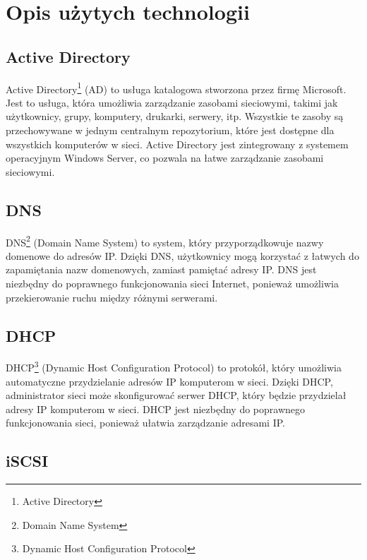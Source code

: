 \newpage
\section{Opis użytych technologii}		%

\subsection{Active Directory} 

Active Directory\footnote{Active Directory\cite{ActiveDirectoryWiki}} (AD) to usługa katalogowa stworzona przez firmę Microsoft. Jest to usługa, która umożliwia zarządzanie zasobami sieciowymi, takimi jak użytkownicy, grupy, komputery, drukarki, serwery, itp. Wszystkie te zasoby są przechowywane w jednym centralnym repozytorium, które jest dostępne dla wszystkich komputerów w sieci. Active Directory jest zintegrowany z systemem operacyjnym Windows Server, co pozwala na łatwe zarządzanie zasobami sieciowymi.

\subsection{DNS}

DNS\footnote{Domain Name System\cite{DNSWiki}} (Domain Name System) to system, który przyporządkowuje nazwy domenowe do adresów IP. Dzięki DNS, użytkownicy mogą korzystać z łatwych do zapamiętania nazw domenowych, zamiast pamiętać adresy IP. DNS jest niezbędny do poprawnego funkcjonowania sieci Internet, ponieważ umożliwia przekierowanie ruchu między różnymi serwerami.

\subsection{DHCP}

DHCP\footnote{Dynamic Host Configuration Protocol\cite{DHCPwiki}} (Dynamic Host Configuration Protocol) to protokół, który umożliwia automatyczne przydzielanie adresów IP komputerom w sieci. Dzięki DHCP, administrator sieci może skonfigurować serwer DHCP, który będzie przydzielał adresy IP komputerom w sieci. DHCP jest niezbędny do poprawnego funkcjonowania sieci, ponieważ ułatwia zarządzanie adresami IP.

\subsection{iSCSI}

